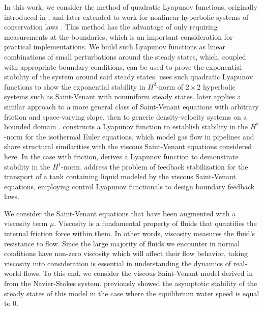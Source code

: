 \documentclass[11pt]{article}
\begin{document}
In this work, we consider the method of quadratic Lyapunov functions, originally introduced in \cite{coron1999lyapunov}, and later extended to work for nonlinear hyperbolic systems of conservation laws \cite{coron2007strict,coron2008dissipative}. This method has the advantage of only requiring measurements at the boundaries, which is an important consideration for practical implementations. We build such Lyapunov functions as linear combinations of small perturbations around the steady states, which, coupled with appropriate boundary conditions, can be used to prove the exponential stability of the system around said steady states. \cite{bastin2017quadratic} uses such quadratic Lyapunov functions to show the exponential stability in $H^2$-norm of $2 \times 2$ hyperbolic systems such as Saint-Venant with nonuniform steady states. \cite{hayat2019quadratic} later applies a similar approach to a more general class of Saint-Venant equations with arbitrary friction and space-varying slope, then to generic density-velocity systems on a bounded domain \cite{hayat2021exponential}.{\cite{gugat2012h} constructs a Lyapunov function to establish stability in the $H^2$-norm for the isothermal Euler equations, which model gas flow in pipelines and share structural similarities with the viscous Saint-Venant equations considered here. In the case with friction, \cite{dick2011strict} derives a Lyapunov function to demonstrate stability in the $H^1$-norm.}{\cite{karafyllis2022spill,karafyllis2022feedback} address the problem of feedback stabilization for the transport of a tank containing liquid modeled by the viscous Saint-Venant equations, employing control Lyapunov functionals to design boundary feedback laws.}

We consider the Saint-Venant equations that have been augmented with a viscosity term $\mu$. Viscosity is a fundamental property of fluids that quantifies the internal friction force within them. In other words, viscosity measures the fluid's resistance to flow. Since the large majority of fluids we encounter in normal conditions have non-zero viscosity which will affect their flow behavior, taking viscosity into consideration is essential in understanding the dynamics of real-world flows. To this end, we consider the viscous Saint-Venant model derived in \cite{gerbeau2000derivation} from the Navier-Stokes system. \cite{mascia2005asymptotic} previously showed the asymptotic stability of the steady states of this model in the case where the equilibrium water speed is equal to 0. 
\end{document}
